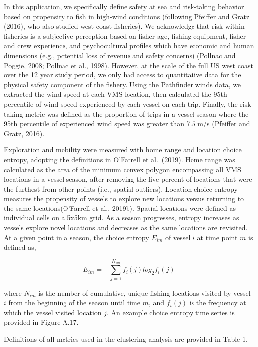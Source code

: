 \documentclass[]{elsarticle} %
\begin{document}
In this application, we specifically define safety at sea and
risk-taking behavior based on propensity to fish in high-wind conditions
(following Pfeiffer and Gratz (2016), who also studied west-coast
fisheries). We acknowledge that risk within fisheries is a subjective
perception based on fisher age, fishing equipment, fisher and crew
experience, and psychocultural profiles which have economic and human
dimensions (e.g., potential loss of revenue and safety concerns)
(Pollnac and Poggie, 2008; Pollnac et al., 1998). However, at the scale
of the full US west coast over the 12 year study period, we only had
access to quantitative data for the physical safety component of the
fishery. Using the Pathfinder winds data, we extracted the wind speed at
each VMS location, then calculated the 95th percentile of wind speed
experienced by each vessel on each trip. Finally, the risk-taking metric
was defined as the proportion of trips in a vessel-season where the 95th
percentile of experienced wind speed was greater than 7.5 m/s (Pfeiffer
and Gratz, 2016).

Exploration and mobility were measured with home range and location
choice entropy, adopting the definitions in O'Farrell et al.~(2019).
Home range was calculated as the area of the minimum convex polygon
encompassing all VMS locations in a vessel-season, after removing the
five percent of locations that were the furthest from other points
(i.e., spatial outliers). Location choice entropy measures the
propensity of vessels to explore new locations versus returning to the
same locations(O'Farrell et al., 2019b). Spatial locations were defined
as individual cells on a 5x5km grid. As a season progresses, entropy
increases as vessels explore novel locations and decreases as the same
locations are revisited. At a given point in a season, the choice
entropy \(E_{im}\) of vessel \(i\) at time point \(m\) is defined as,

\begin{equation}
  E_{im} = -\sum_{j=1}^{N_{im}}f_i(j)log_2f_i(j)
\end{equation}

where \(N_{im}\) is the number of cumulative, unique fishing locations
visited by vessel \(i\) from the beginning of the season until time
\(m\), and \(f_i(j)\) is the frequency at which the vessel visited
location \(j\). An example choice entropy time series is provided in
Figure A.17.

Definitions of all metrics used in the clustering analysis are provided
in Table 1.
\end{document}
